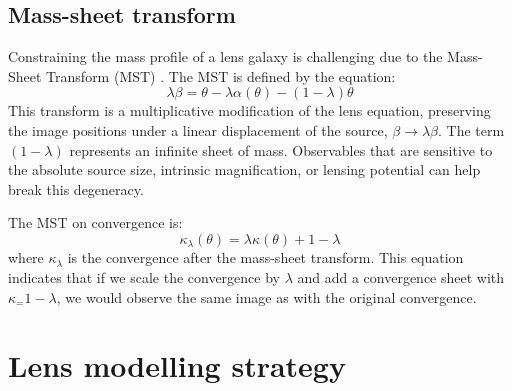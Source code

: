 \documentclass[fleqn,usenatbib]{mnras}
\begin{document}
\subsection{Mass-sheet transform}
Constraining the mass profile of a lens galaxy is challenging due to the Mass-Sheet Transform (MST) \citep{Falco1985}. The MST is defined by the equation:
\begin{equation}
\lambda \beta=\theta-\lambda \alpha(\theta)-(1-\lambda) \theta
\end{equation}
This transform is a multiplicative modification of the lens equation, preserving the image positions under a linear displacement of the source, $\beta \rightarrow \lambda \beta$. The term $(1 - \lambda)$ represents an infinite sheet of mass. Observables that are sensitive to the absolute source size, intrinsic magnification, or lensing potential can help break this degeneracy. 

The MST on convergence is:
\begin{equation}
\label{eq:mst}
    \kappa_{\lambda}(\theta) = \lambda \kappa(\theta) + 1 - \lambda
\end{equation}
where $\kappa_\lambda$ is the convergence after the mass-sheet transform. This equation indicates that if we scale the convergence by $\lambda$ and add a convergence sheet with $\kappa_=1-\lambda$, we would observe the same image as with the original convergence.

\section{Lens modelling strategy}
\end{document}
